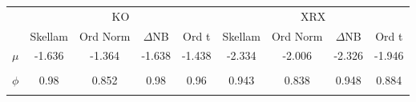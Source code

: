 \begin{footnotesize}
\tabcolsep=0.07cm
\begin{singlespace}
\begin{tabular}{ccccccccc} \toprule 
 & \multicolumn{4}{c}{KO}& \multicolumn{4}{c}{XRX} \\ 
\cmidrule(r){2-5} \cmidrule(r){6-9} &  \multicolumn{1}{c}{Skellam}&  \multicolumn{1}{c}{Ord Norm}&  \multicolumn{1}{c}{$\Delta$NB}&  \multicolumn{1}{c}{Ord t}&  \multicolumn{1}{c}{Skellam}&  \multicolumn{1}{c}{Ord Norm}&  \multicolumn{1}{c}{$\Delta$NB}&  \multicolumn{1}{c}{Ord t} \\ \midrule 
 $ \mu $ & -1.636 & -1.364 & -1.638 & -1.438 & -2.334 & -2.006 & -2.326 & -1.946 \\ 
 & \begin{tiny} [-1.693,-1.581] \end{tiny}  & \begin{tiny} [-1.403,-1.325] \end{tiny}  & \begin{tiny} [-1.694,-1.582] \end{tiny}  & \begin{tiny} [-1.493,-1.384] \end{tiny}  & \begin{tiny} [-2.393,-2.275] \end{tiny}  & \begin{tiny} [-2.05,-1.962] \end{tiny}  & \begin{tiny} [-2.386,-2.266] \end{tiny}  & \begin{tiny} [-1.989,-1.903] \end{tiny}  \\ 
$ \phi $ & 0.98 & 0.852 & 0.98 & 0.96 & 0.943 & 0.838 & 0.948 & 0.884 \\ 
 & \begin{tiny} [0.973,0.987] \end{tiny}  & \begin{tiny} [0.826,0.877] \end{tiny}  & \begin{tiny} [0.973,0.987] \end{tiny}  & \begin{tiny} [0.943,0.974] \end{tiny}  & \begin{tiny} [0.929,0.959] \end{tiny}  & \begin{tiny} [0.817,0.862] \end{tiny}  & \begin{tiny} [0.934,0.962] \end{tiny}  & \begin{tiny} [0.862,0.906] \end{tiny}  \\ 

\end{tabular}
\end{singlespace}
\end{footnotesize}
